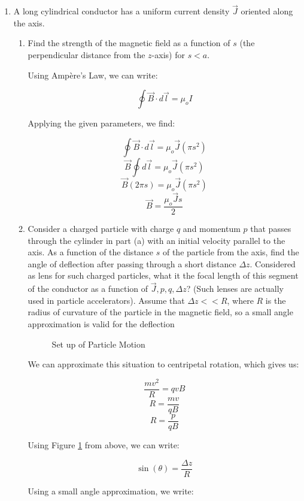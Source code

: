 \begin{enumerate}
  \item A long cylindrical conductor has a uniform current density $\vec{J}$ oriented along the axis.

    \begin{enumerate}

      \item Find the strength of the magnetic field as a function of $s$ (the perpendicular distance from the $z$-axis) for $s<a$.

        Using Amp\`ere's Law, we can write:

        $$\oint\vec{B}\cdot d\vec{l}=\mu_o I$$

        Applying the given parameters, we find:

        $$\oint\vec{B}\cdot d\vec{l}=\mu_o \vec{J}(\pi s^2)$$
        $$\vec{B}\oint d\vec{l}=\mu_o \vec{J}(\pi s^2)$$
        $$\vec{B}(2\pi s)=\mu_o \vec{J}(\pi s^2)$$
        $$\boxed{\vec{B}=\frac{\mu_o \vec{J} s}{2}}$$

      \item Consider a charged particle with charge $q$ and momentum $p$ that passes through the cylinder in part (a) with an initial velocity parallel to the axis.  As a function of the distance $s$ of the particle from the axis, find the angle of deflection after passing through a short distance $\Delta z$. Considered as lens for such charged particles, what it the focal length of this segment of the conductor as a function of $\vec{J},p,q,\Delta z$? (Such lenses are actually used in particle accelerators). Assume that $\Delta z<<R$, where $R$ is the radius of curvature of the particle in the magnetic field, so a small angle approximation is valid for the deflection

        \begin{figure}[h!]
          \centering
          
          \caption{Set up of Particle Motion}
          \label{fig:1}
        \end{figure}

        We can approximate this situation to centripetal rotation, which gives us:

        $$\frac{mv^2}{R}=qvB$$
        $$R=\frac{mv}{qB}$$
        $$R=\frac{p}{qB}$$

        Using Figure \ref{fig:1} from above, we can write:

        $$\sin(\theta)=\frac{\Delta z}{R}$$

        Using a small angle approximation, we write:


\end{enumerate}
\end{enumerate}
